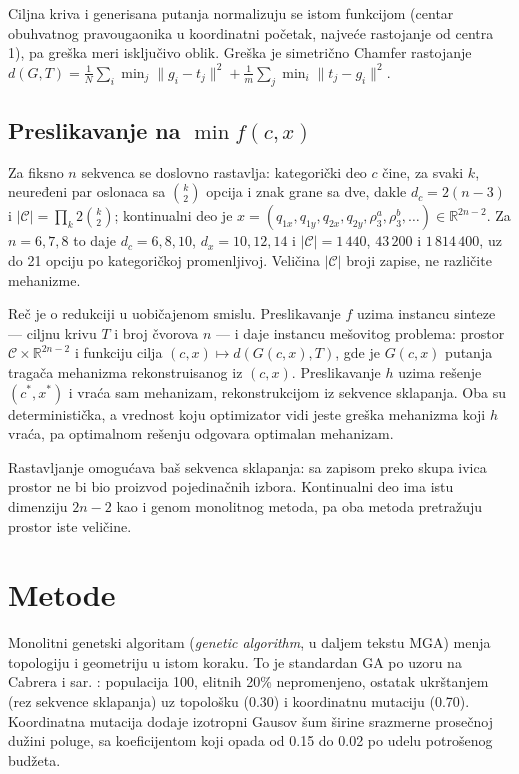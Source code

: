 \documentclass[
  conference,
  a4paper,
  10pt]{IEEEtran}
\begin{document}
Ciljna kriva i generisana putanja normalizuju se istom funkcijom (centar
obuhvatnog pravougaonika u koordinatni početak, najveće rastojanje od
centra 1), pa greška meri isključivo oblik. Greška je simetrično Chamfer
rastojanje
\(d(G,T) = \frac{1}{N}\sum_{i}\min_j \lVert g_i - t_j\rVert^2 + \frac{1}{m}\sum_{j}\min_i \lVert t_j - g_i\rVert^2\).

\hypertarget{preslikavanje-na-min-fcx}{%
\subsection{\texorpdfstring{Preslikavanje na
\(\min f(c,x)\)}{Preslikavanje na \textbackslash min f(c,x)}}\label{preslikavanje-na-min-fcx}}

Za fiksno \(n\) sekvenca se doslovno rastavlja: kategorički deo \(c\)
čine, za svaki \(k\), neuređeni par oslonaca sa \(\binom{k}{2}\) opcija
i znak grane sa dve, dakle \(d_c = 2(n-3)\) i
\(|\mathcal{C}| = \prod_k 2\binom{k}{2}\); kontinualni deo je
\(x = (q_{1x},q_{1y},q_{2x},q_{2y},\rho^a_3,\rho^b_3,\dots) \in \mathbb{R}^{2n-2}\).
Za \(n = 6, 7, 8\) to daje \(d_c = 6, 8, 10\), \(d_x = 10, 12, 14\) i
\(|\mathcal{C}| = 1\,440\), \(43\,200\) i \(1\,814\,400\), uz do 21
opciju po kategoričkoj promenljivoj. Veličina \(|\mathcal{C}|\) broji
zapise, ne različite mehanizme.

Reč je o redukciji u uobičajenom smislu. Preslikavanje \(f\) uzima
instancu sinteze --- ciljnu krivu \(T\) i broj čvorova \(n\) --- i daje
instancu mešovitog problema: prostor
\(\mathcal{C} \times \mathbb{R}^{2n-2}\) i funkciju cilja
\((c,x) \mapsto d(G(c,x), T)\), gde je \(G(c,x)\) putanja tragača
mehanizma rekonstruisanog iz \((c,x)\). Preslikavanje \(h\) uzima
rešenje \((c^*, x^*)\) i vraća sam mehanizam, rekonstrukcijom iz
sekvence sklapanja. Oba su deterministička, a vrednost koju optimizator
vidi jeste greška mehanizma koji \(h\) vraća, pa optimalnom rešenju
odgovara optimalan mehanizam.

Rastavljanje omogućava baš sekvenca sklapanja: sa zapisom preko skupa
ivica prostor ne bi bio proizvod pojedinačnih izbora. Kontinualni deo
ima istu dimenziju \(2n-2\) kao i genom monolitnog metoda, pa oba metoda
pretražuju prostor iste veličine.

\hypertarget{metode}{%
\section{Metode}\label{metode}}

Monolitni genetski algoritam (\emph{genetic algorithm}, u daljem tekstu
MGA) menja topologiju i geometriju u istom koraku. To je standardan GA
po uzoru na Cabrera i sar. \citep{cabrera}: populacija 100, elitnih 20\%
nepromenjeno, ostatak ukrštanjem (rez sekvence sklapanja) uz topološku
(0.30) i koordinatnu mutaciju (0.70). Koordinatna mutacija dodaje
izotropni Gausov šum širine srazmerne prosečnoj dužini poluge, sa
koeficijentom koji opada od 0.15 do 0.02 po udelu potrošenog budžeta.
\end{document}
